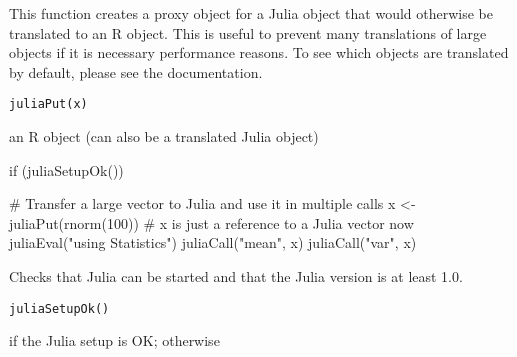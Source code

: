 %
\begin{Description}\relax
This function creates a proxy object for a Julia object that would
otherwise be translated to an R object.
This is useful to prevent many translations of large objects
if it is necessary performance reasons.
To see which objects are translated by default, please see the
 documentation.
\end{Description}
%
\begin{Usage}
\begin{verbatim}
juliaPut(x)
\end{verbatim}
\end{Usage}
%
\begin{Arguments}
\begin{ldescription}
\item[\code{x}] an R object (can also be a translated Julia object)
\end{ldescription}
\end{Arguments}
%
\begin{Examples}
\begin{ExampleCode}
if (juliaSetupOk()) {

   # Transfer a large vector to Julia and use it in multiple calls
   x <- juliaPut(rnorm(100))
   # x is just a reference to a Julia vector now
   juliaEval("using Statistics")
   juliaCall("mean", x)
   juliaCall("var", x)

}


\end{ExampleCode}
\end{Examples}
%
\begin{Description}\relax
Checks that Julia can be started and that the Julia version is at least 1.0.
\end{Description}
%
\begin{Usage}
\begin{verbatim}
juliaSetupOk()
\end{verbatim}
\end{Usage}
%
\begin{Value}
 if the Julia setup is OK; otherwise 
\end{Value}